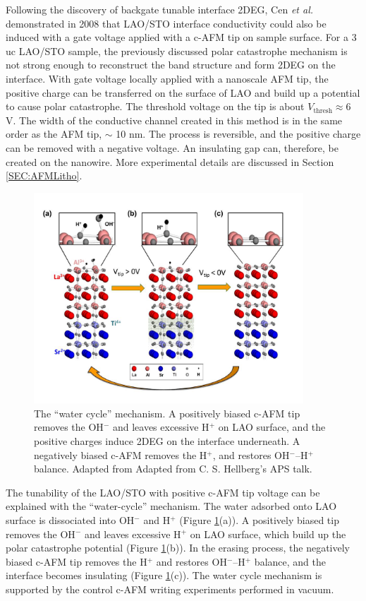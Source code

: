 \documentclass[pdflatex, sectionletters, 12pt, final, phd]{pittetd}    %
\begin{document}
Following the discovery of backgate tunable interface 2DEG, Cen \textit{et al.}  demonstrated in 2008 that LAO/STO interface conductivity could also be induced with a gate voltage applied with a c-AFM tip on sample surface\cite{cen2008nanoscale}. For a 3 uc LAO/STO sample, the previously discussed polar catastrophe mechanism is not strong enough to reconstruct the band structure and form 2DEG on the interface. With gate voltage locally applied with a nanoscale AFM tip, the positive charge can be transferred on the surface of LAO and build up a potential to cause polar catastrophe. The threshold voltage on the tip is about $V_\mathrm{thresh} \approx 6$ V\cite{cen2008nanoscale}. The width of the conductive channel created in this method is in the same order as the AFM tip, $\sim$ 10 nm. The process is reversible, and the positive charge can be removed with a negative voltage. An insulating gap can, therefore, be created on the nanowire. More experimental details are discussed in Section \ref{SEC:AFMLitho}.

\begin{figure}[h!]
	\centering
	\includegraphics[width=0.9\textwidth]{Drawing/WaterCycle.png}
	\caption[The ``water cycle'' mechanism]{The ``water cycle'' mechanism. A positively biased c-AFM tip removes the OH$^{-}$ and leaves excessive H$^{+}$ on LAO surface, and the positive charges induce 2DEG on the interface underneath. A negatively biased c-AFM removes the H$^{+}$, and restores OH$^{-}$--H$^{+}$ balance. Adapted from Adapted from C. S. Hellberg's APS talk.}
	\label{FIG:WaterCycle}
\end{figure}

The tunability of the LAO/STO with positive c-AFM tip voltage can be explained with the ``water-cycle'' mechanism\cite{bi2010water}. The water adsorbed onto LAO surface is dissociated into OH$^{-}$ and H$^{+}$ (Figure \ref{FIG:WaterCycle}(a)). A positively biased tip removes the OH$^{-}$ and leaves excessive H$^{+}$ on LAO surface, which build up the polar catastrophe potential (Figure \ref{FIG:WaterCycle}(b)). In the erasing process, the negatively biased c-AFM tip removes the H$^{+}$ and restores OH$^{-}$--H$^{+}$ balance, and the interface becomes insulating (Figure \ref{FIG:WaterCycle}(c)). The water cycle mechanism is supported by the control c-AFM writing experiments performed in vacuum\cite{bi2010water}.
\end{document}
